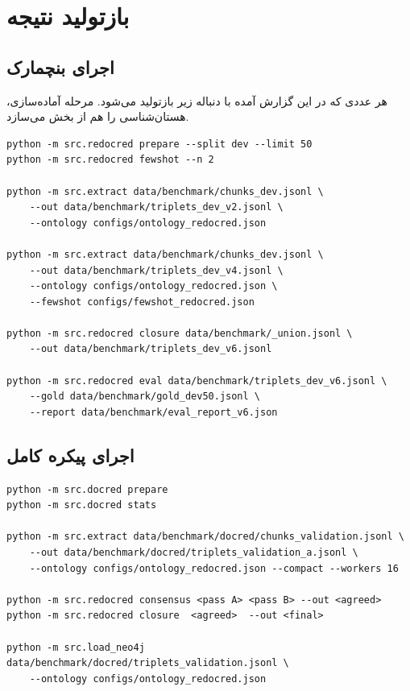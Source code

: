 \chapter{بازتولید نتیجه}
\label{app:repro}

\section{اجرای بنچمارک}
\label{sec:app-bench}

هر عددی که در این گزارش آمده با دنباله زیر بازتولید می‌شود. مرحله آماده‌سازی، هستان‌شناسی را هم از بخش  می‌سازد.

\begin{latin}
\begin{verbatim}
python -m src.redocred prepare --split dev --limit 50
python -m src.redocred fewshot --n 2

python -m src.extract data/benchmark/chunks_dev.jsonl \
    --out data/benchmark/triplets_dev_v2.jsonl \
    --ontology configs/ontology_redocred.json

python -m src.extract data/benchmark/chunks_dev.jsonl \
    --out data/benchmark/triplets_dev_v4.jsonl \
    --ontology configs/ontology_redocred.json \
    --fewshot configs/fewshot_redocred.json

python -m src.redocred closure data/benchmark/_union.jsonl \
    --out data/benchmark/triplets_dev_v6.jsonl

python -m src.redocred eval data/benchmark/triplets_dev_v6.jsonl \
    --gold data/benchmark/gold_dev50.jsonl \
    --report data/benchmark/eval_report_v6.json
\end{verbatim}
\end{latin}

\section{اجرای پیکره کامل}
\label{sec:app-full}

\begin{latin}
\begin{verbatim}
python -m src.docred prepare
python -m src.docred stats

python -m src.extract data/benchmark/docred/chunks_validation.jsonl \
    --out data/benchmark/docred/triplets_validation_a.jsonl \
    --ontology configs/ontology_redocred.json --compact --workers 16

python -m src.redocred consensus <pass A> <pass B> --out <agreed>
python -m src.redocred closure  <agreed>  --out <final>

python -m src.load_neo4j data/benchmark/docred/triplets_validation.jsonl \
    --ontology configs/ontology_redocred.json
\end{verbatim}
\end{latin}


